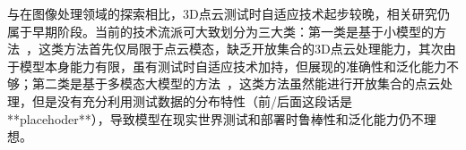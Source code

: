 \documentclass[12pt]{article}
\begin{document}



与在图像处理领域的探索相比，3D点云测试时自适应技术起步较晚，相关研究仍属于早期阶段。当前的技术流派可大致划分为三大类：第一类是基于小模型的方法~\cite{mirza23mate,wang24bftt3d,shim24cloudfixer}，这类方法首先仅局限于点云模态，缺乏开放集合的3D点云处理能力，其次由于模型本身能力有限，虽有测试时自适应技术加持，但展现的准确性和泛化能力不够；第二类是基于多模态大模型的方法~\cite{sun25pointcache,tamjidi2025uniadapter}，这类方法虽然能进行开放集合的点云处理，但是没有充分利用测试数据的分布特性（前/后面这段话是 **placehoder**），导致模型在现实世界测试和部署时鲁棒性和泛化能力仍不理想。


\end{document}
